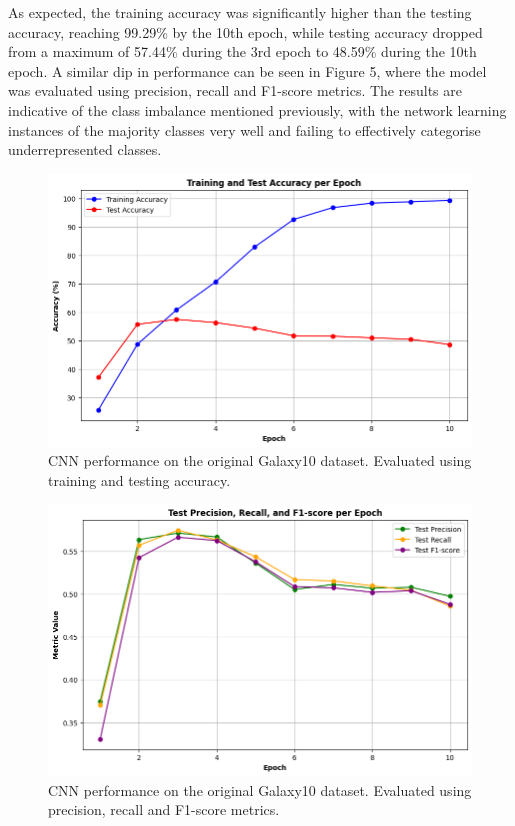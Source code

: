 \documentclass[10pt,twocolumn,letterpaper]{article}
\begin{document}
As expected, the training accuracy was significantly higher than the testing accuracy, reaching 99.29\% by the 10th epoch, while testing accuracy dropped from a maximum of 57.44\% during the 3rd epoch to 48.59\% during the 10th epoch.
A similar dip in performance can be seen in Figure 5, where the model was evaluated using precision, recall and F1-score metrics. 
The results are indicative of the class imbalance mentioned previously, with the network learning instances of the majority classes very well and failing to effectively categorise underrepresented classes. 
\begin{figure}[htbp]
    \includegraphics[width=\linewidth]{initial_cnn_acc.png}
    \caption{CNN performance on the original Galaxy10 dataset. Evaluated using training and testing accuracy.}
    \label{fig:initialcnnacc}
  \end{figure}

\begin{figure}[htbp]
    \includegraphics[width=\linewidth]{initial_cnn_metrics.png}
    \caption{CNN performance on the original Galaxy10 dataset. Evaluated using precision, recall and F1-score metrics.}
    \label{fig:initialcnnmet}
  \end{figure}
\end{document}
